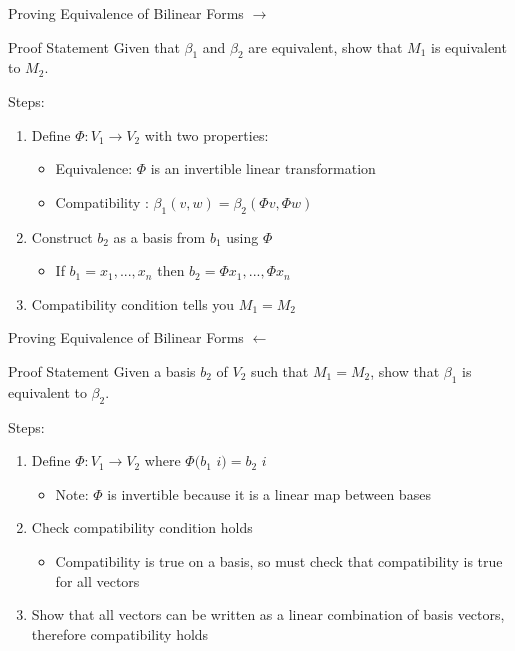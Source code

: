 \documentclass[svgnames]{beamer}
\begin{document}
\begin{frame}{Proving Equivalence of Bilinear Forms $\rightarrow$}
\begin{block}{Proof Statement}
Given that $\beta_1$ and $\beta_2$ are equivalent, show that $M_1$ is equivalent to $M_2$.
\end{block}
Steps:
\begin{enumerate}
    \item Define $\Phi : V_1 \rightarrow V_2$ with two properties:
    \begin{itemize}
        \item Equivalence: $\Phi$ is an invertible linear transformation
        \item Compatibility : $\beta_1 (v,w)= \beta_2 (\Phi v, \Phi w )$
    \end{itemize}
    \item Construct $b_2$ as a basis from $b_1$ using $\Phi$
    \begin{itemize}
        \item If $b_1 = x_1, . . . , x_n$ then $b_2 = \Phi x_1, . . . , \Phi x_n$
    \end{itemize}
    \item Compatibility condition tells you $M_1 = M_2$
\end{enumerate}
\end{frame}

\begin{frame}{Proving Equivalence of Bilinear Forms $\leftarrow$}
\begin{block}{Proof Statement}
Given a basis $b_2$ of $V_2$ such that $M_1 = M_2$, show that $\beta_1$ is equivalent to $\beta_2$.
\end{block}
Steps:
\begin{enumerate}
    \item Define $\Phi : V_1 \rightarrow V_2$ where $\Phi (b_1$ $i) = b_2$ $i$
    \begin{itemize}
        \item Note: $\Phi$ is invertible because it is a linear map between bases
    \end{itemize}
    \item Check compatibility condition holds
    \begin{itemize}
        \item Compatibility is true on a basis, so must check that compatibility is true for all vectors
    \end{itemize}
    \item Show that all vectors can be written as a linear combination of basis vectors, therefore compatibility holds
\end{enumerate}
\end{frame}
\end{document}
